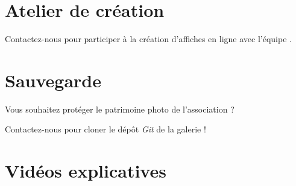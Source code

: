 \documentclass[12pt,nofoldmark,notumble]{leaflet}
\begin{document}
\section{\faUniversity Atelier de création}

Contactez-nous pour participer à la création d'affiches en ligne
avec l'équipe .

\begin{center}
  \setlength{\fboxsep}{0pt}%
  \setlength{\fboxrule}{0pt}%
\end{center}
\vspace*{\fill}
\section{\faSave Sauvegarde}

Vous souhaitez protéger le patrimoine photo de l'association ?

Contactez-nous pour cloner le dépôt \emph{Git} de la galerie !
\vspace*{\fill}
\section{\faYoutube Vidéos explicatives}


\begin{center}
  \setlength{\fboxsep}{0pt}%
  \setlength{\fboxrule}{0pt}%
 \end{center} 
\end{document}
